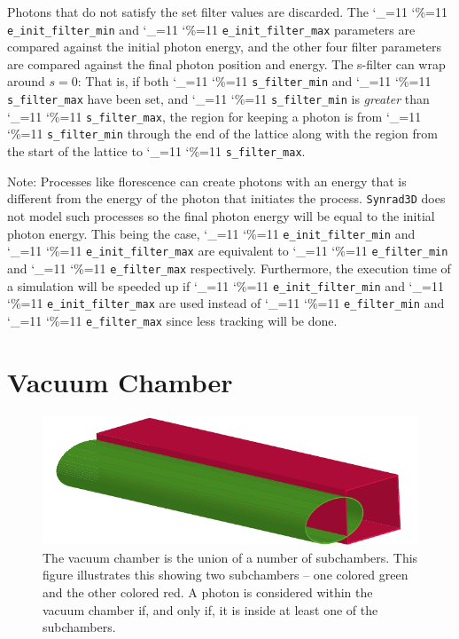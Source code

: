 \documentclass[11pt,openany]{report}
\newcommand{\srthree}{\texttt{Synrad3D}\xspace}
\newcommand\ttcmd{\begingroup\catcode`\_=11 \catcode`\%=11 \dottcmd}
\newcommand\dottcmd[1]{\texttt{#1}\endgroup}
\newcommand{\vn}{\ttcmd}
\begin{document}
Photons that do not satisfy the set filter values are discarded. The
\vn{e_init_filter_min} and \vn{e_init_filter_max} parameters are 
compared against the initial photon energy, and the other four
filter parameters are compared against the final photon position and
energy. The s-filter can wrap around $s = 0$: That is,
if both \vn{s_filter_min} and \vn{s_filter_max} have been set,
and \vn{s_filter_min} is {\em greater} than \vn{s_filter_max}, the region
for keeping a photon is from \vn{s_filter_min} through the end of the
lattice along with the region from the start of the lattice to
\vn{s_filter_max}.

Note: Processes like florescence can create photons with an energy that is different
from the energy of the photon that initiates the process. \srthree does not model such
processes so the final photon energy will be equal to the initial photon energy. This
being the case, \vn{e_init_filter_min} and \vn{e_init_filter_max} are equivalent to
\vn{e_filter_min} and \vn{e_filter_max} respectively. Furthermore, the execution time of a
simulation will be speeded up if \vn{e_init_filter_min} and \vn{e_init_filter_max} are
used instead of \vn{e_filter_min} and \vn{e_filter_max} since less tracking will be done.

\chapter{Vacuum Chamber} 
\label{s:vac.chamber}

\begin{figure}[bt]
\begin{center}
\includegraphics[width=5in]{vac-pipe.pdf} \caption[The vacuum chamber is the union of a
number of subchambers.]{The vacuum chamber is the union of a number of subchambers.
This figure illustrates this showing two subchambers -- one colored green and the other
colored red. A photon is considered within the vacuum chamber if, and only if, it is
inside at least one of the subchambers.}
\label{f:vac-chamber}
\end{center}
\end{figure}
\end{document}
